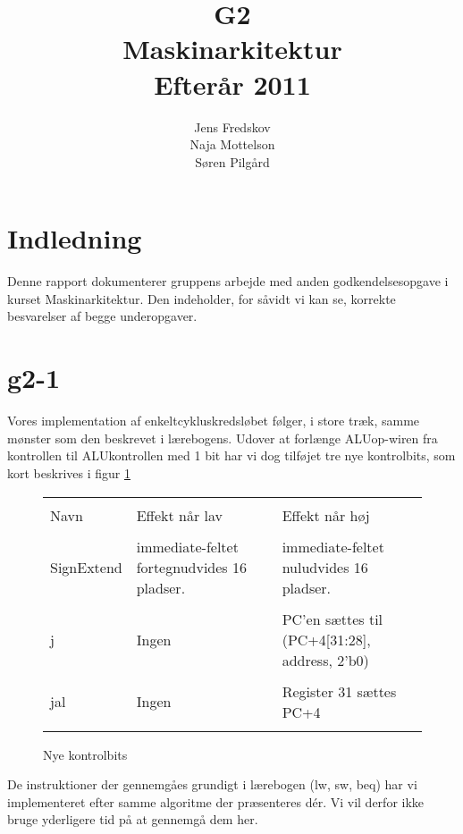 \documentclass[10pt,a4paper,danish]{article}
\title{G2\\Maskinarkitektur\\Efterår 2011}
\author{Jens Fredskov\\ Naja Mottelson\\Søren Pilgård}
\begin{document}
\maketitle
\newpage

\tableofcontents
\newpage

\section{Indledning}
Denne rapport dokumenterer gruppens arbejde med anden godkendelsesopgave i kurset Maskinarkitektur. Den indeholder, for såvidt vi kan se, korrekte besvarelser af begge underopgaver. 

\section{g2-1}
Vores implementation af enkeltcykluskredsløbet følger, i store træk, samme mønster som den beskrevet i lærebogens. Udover at forlænge ALUop-wiren fra kontrollen til ALUkontrollen med 1 bit har vi dog tilføjet tre nye kontrolbits, som kort beskrives i figur \ref{fig:newcontrols}

\begin{figure}[htb]
  \begin{tabular}{| l | p{5cm} | p{5cm} |}
    \hline\\
    Navn & Effekt når lav & Effekt når høj\\ 
    \hline\\
    SignExtend & immediate-feltet fortegnudvides 16 pladser. & immediate-feltet nuludvides 16 pladser.\\
    \hline\\
    j & Ingen & PC'en sættes til (PC+4[31:28], address, 2'b0) \\
    \hline\\
    jal & Ingen & Register 31 sættes PC+4\\
    \hline\\
  \end{tabular}
  \caption{Nye kontrolbits}
  \label{fig:newcontrols}
\end{figure}

De instruktioner der gennemgåes grundigt i lærebogen (lw, sw, beq) har vi implementeret efter samme algoritme der præsenteres dér. Vi vil derfor ikke bruge yderligere tid på at gennemgå dem her. 
\end{document}
